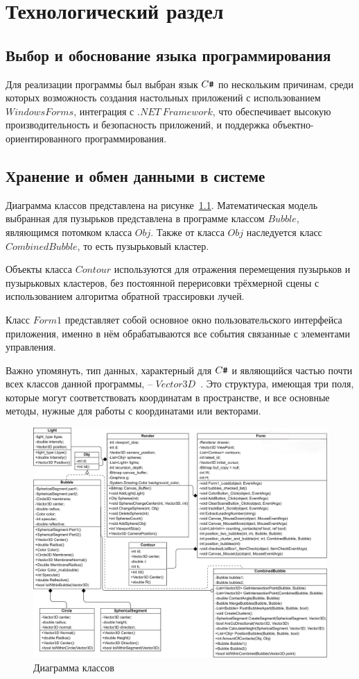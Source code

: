 \chapter{Технологический раздел}
\section{Выбор и обоснование языка программирования}
Для реализации программы был выбран язык $C\verb|#|$ по нескольким причинам, среди которых возможность создания настольных приложений с использованием $Windows Forms$, интеграция с $.NET~Framework$, что обеспечивает высокую производительность и безопасность приложений, и поддержка объектно-ориентированного программирования.
\section{Хранение и обмен данными в системе}
Диаграмма классов представлена на рисунке~\ref{fig:class_diagram}. Математическая модель выбранная для пузырьков представлена в программе классом $Bubble$, являющимся потомком класса $Obj$. Также от класса $Obj$ наследуется класс $CombinedBubble$, то есть пузырьковый кластер. 

Объекты класса $Contour$ используются для отражения перемещения пузырьков и пузырьковых кластеров, без постоянной перерисовки трёхмерной сцены с использованием алгоритма обратной трассировки лучей.

Класс $Form1$ представляет собой основное окно пользовательского интерфейса приложения, именно в нём обрабатываются все события связанные с элементами управления.

Важно упомянуть, тип данных, характерный для $C\verb|#|$ и являющийся частью почти всех классов данной программы, -- $Vector3D$~\cite{vector3d}. Это структура, имеющая три поля, которые могут соответствовать координатам в пространстве, и все основные методы, нужные для работы с координатами или векторами. 
\begin{figure}[h]
	\centering
	\includegraphics[angle=90, width=1\linewidth]{pictures/КГ_курсач_диаграмма классов.jpg}
	\caption{Диаграмма классов}
	\label{fig:class_diagram}
\end{figure}
\clearpage

